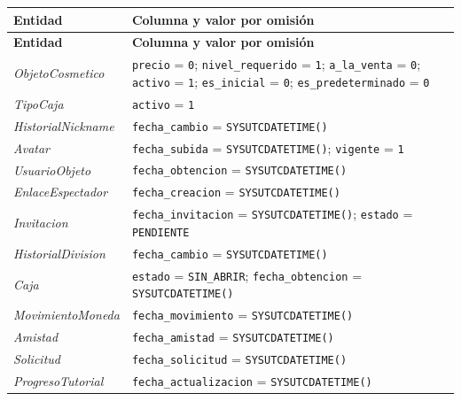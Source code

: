 \begin{center}\small
\begin{longtable}{|L{0.22\textwidth}|L{0.68\textwidth}|}
\hline
\textbf{Entidad} & \textbf{Columna y valor por omisión} \\ \hline
\endfirsthead
\hline
\textbf{Entidad} & \textbf{Columna y valor por omisión} \\ \hline
\endhead
\textit{Objeto\-Cosmetico} & \texttt{precio} = \texttt{0}; \texttt{nivel\_\allowbreak{}requerido} = \texttt{1}; \texttt{a\_\allowbreak{}la\_\allowbreak{}venta} = \texttt{0}; \texttt{activo} = \texttt{1}; \texttt{es\_\allowbreak{}inicial} = \texttt{0}; \texttt{es\_\allowbreak{}predeterminado} = \texttt{0} \\ \hline
\textit{Tipo\-Caja} & \texttt{activo} = \texttt{1} \\ \hline
\textit{Historial\-Nickname} & \texttt{fecha\_\allowbreak{}cambio} = \texttt{SYSUTCDATETIME()} \\ \hline
\textit{Avatar} & \texttt{fecha\_\allowbreak{}subida} = \texttt{SYSUTCDATETIME()}; \texttt{vigente} = \texttt{1} \\ \hline
\textit{Usuario\-Objeto} & \texttt{fecha\_\allowbreak{}obtencion} = \texttt{SYSUTCDATETIME()} \\ \hline
\textit{Enlace\-Espectador} & \texttt{fecha\_\allowbreak{}creacion} = \texttt{SYSUTCDATETIME()} \\ \hline
\textit{Invitacion} & \texttt{fecha\_\allowbreak{}invitacion} = \texttt{SYSUTCDATETIME()}; \texttt{estado} = \texttt{\textquotesingle{}PENDIENTE\textquotesingle{}} \\ \hline
\textit{Historial\-Division} & \texttt{fecha\_\allowbreak{}cambio} = \texttt{SYSUTCDATETIME()} \\ \hline
\textit{Caja} & \texttt{estado} = \texttt{\textquotesingle{}SIN\_\allowbreak{}ABRIR\textquotesingle{}}; \texttt{fecha\_\allowbreak{}obtencion} = \texttt{SYSUTCDATETIME()} \\ \hline
\textit{Movimiento\-Moneda} & \texttt{fecha\_\allowbreak{}movimiento} = \texttt{SYSUTCDATETIME()} \\ \hline
\textit{Amistad} & \texttt{fecha\_\allowbreak{}amistad} = \texttt{SYSUTCDATETIME()} \\ \hline
\textit{Solicitud} & \texttt{fecha\_\allowbreak{}solicitud} = \texttt{SYSUTCDATETIME()} \\ \hline
\textit{Progreso\-Tutorial} & \texttt{fecha\_\allowbreak{}actualizacion} = \texttt{SYSUTCDATETIME()} \\ \hline
\end{longtable}
\end{center}
